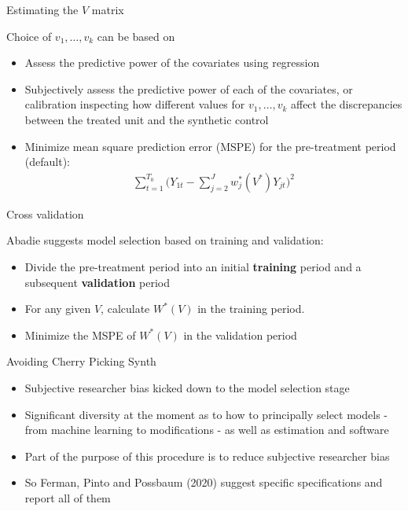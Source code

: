 \documentclass{beamer}
\begin{document}
\begin{frame}{Estimating the $V$ matrix}
	
 Choice of $v_1, \dots, v_k$ can be based on
		\begin{itemize}
		\item Assess the predictive power of the covariates using regression
		\item Subjectively assess the predictive power of each of the covariates, or calibration inspecting how different values for $v_1, \dots, v_k$ affect the discrepancies between the treated unit and the synthetic control
		\item Minimize mean square prediction error (MSPE) for the pre-treatment period (default):
			\begin{eqnarray*}
			\sum_{t=1}^{T_0} \bigg(Y_{1t} - \sum_{j=2}^J w_j^*(V^*)Y_{jt} \bigg)^2
			\end{eqnarray*}
		\end{itemize}
\end{frame}

\begin{frame}{Cross validation}

Abadie suggests model selection based on training and validation:

\begin{itemize}
		\item Divide the pre-treatment period into an initial \textbf{training} period and a subsequent \textbf{validation} period
		\item For any given $V$, calculate $W^*(V)$ in the training period.
		\item Minimize the MSPE of $W^*(V)$ in the validation period
\end{itemize}

\end{frame}

\begin{frame}{Avoiding Cherry Picking Synth}

\begin{itemize}
\item Subjective researcher bias kicked down to the model selection stage
\item Significant diversity at the moment as to how to principally select models - from machine learning to modifications - as well as estimation and software
\item Part of the purpose of this procedure is to reduce subjective researcher bias
\item So Ferman, Pinto and Possbaum (2020) suggest specific specifications and report all of them
\end{itemize}

\end{frame}
\end{document}
